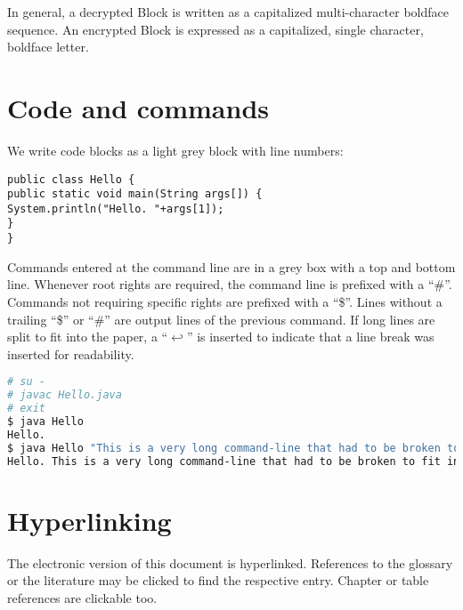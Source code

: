 In general, a decrypted Block is written as a capitalized multi-character boldface sequence. An encrypted Block is expressed as a capitalized, single character, boldface letter.

\section{Code and commands}
We write code blocks as a light grey block with line numbers:

\begin{lstlisting}
public class Hello {
public static void main(String args[]) {
System.println("Hello. "+args[1]);
}
}
\end{lstlisting}

Commands entered at the command line are in a grey box with a top and bottom line. Whenever root rights are required, the command line is prefixed with a ``\#''. Commands not requiring specific rights are prefixed with a ``\$''. Lines without a trailing ``\$'' or ``\#'' are output lines of the previous command. If long lines are split to fit into the paper, a ``$\hookleftarrow$'' is inserted to indicate that a line break was inserted for readability.

\begin{lstlisting}[language=bash]
# su -
# javac Hello.java 
# exit
$ java Hello
Hello.
$ java Hello "This is a very long command-line that had to be broken to fit into the code box displayed on this page."
Hello. This is a very long command-line that had to be broken to fit into the code box displayed on this page.
\end{lstlisting}

\section{Hyperlinking}
The electronic version of this document is hyperlinked. References to the glossary or the literature may be clicked to find the respective entry. Chapter or table references are clickable too. 

